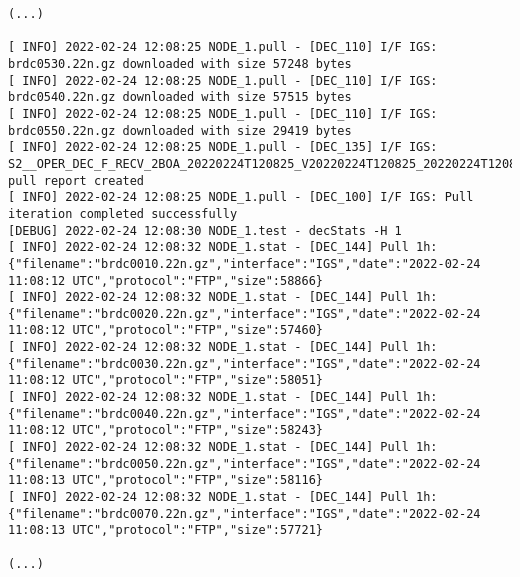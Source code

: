 \documentclass[dec_sum_main.tex]{subfiles}
\begin{document}
\begin{Verbatim}[fontsize=\tiny]
(...)

[ INFO] 2022-02-24 12:08:25 NODE_1.pull - [DEC_110] I/F IGS: brdc0530.22n.gz downloaded with size 57248 bytes
[ INFO] 2022-02-24 12:08:25 NODE_1.pull - [DEC_110] I/F IGS: brdc0540.22n.gz downloaded with size 57515 bytes
[ INFO] 2022-02-24 12:08:25 NODE_1.pull - [DEC_110] I/F IGS: brdc0550.22n.gz downloaded with size 29419 bytes
[ INFO] 2022-02-24 12:08:25 NODE_1.pull - [DEC_135] I/F IGS: S2__OPER_DEC_F_RECV_2BOA_20220224T120825_V20220224T120825_20220224T120825_IGS.xml pull report created
[ INFO] 2022-02-24 12:08:25 NODE_1.pull - [DEC_100] I/F IGS: Pull iteration completed successfully
[DEBUG] 2022-02-24 12:08:30 NODE_1.test - decStats -H 1
[ INFO] 2022-02-24 12:08:32 NODE_1.stat - [DEC_144] Pull 1h: {"filename":"brdc0010.22n.gz","interface":"IGS","date":"2022-02-24 11:08:12 UTC","protocol":"FTP","size":58866}
[ INFO] 2022-02-24 12:08:32 NODE_1.stat - [DEC_144] Pull 1h: {"filename":"brdc0020.22n.gz","interface":"IGS","date":"2022-02-24 11:08:12 UTC","protocol":"FTP","size":57460}
[ INFO] 2022-02-24 12:08:32 NODE_1.stat - [DEC_144] Pull 1h: {"filename":"brdc0030.22n.gz","interface":"IGS","date":"2022-02-24 11:08:12 UTC","protocol":"FTP","size":58051}
[ INFO] 2022-02-24 12:08:32 NODE_1.stat - [DEC_144] Pull 1h: {"filename":"brdc0040.22n.gz","interface":"IGS","date":"2022-02-24 11:08:12 UTC","protocol":"FTP","size":58243}
[ INFO] 2022-02-24 12:08:32 NODE_1.stat - [DEC_144] Pull 1h: {"filename":"brdc0050.22n.gz","interface":"IGS","date":"2022-02-24 11:08:13 UTC","protocol":"FTP","size":58116}
[ INFO] 2022-02-24 12:08:32 NODE_1.stat - [DEC_144] Pull 1h: {"filename":"brdc0070.22n.gz","interface":"IGS","date":"2022-02-24 11:08:13 UTC","protocol":"FTP","size":57721}

(...)


\end{Verbatim}
\end{document}
